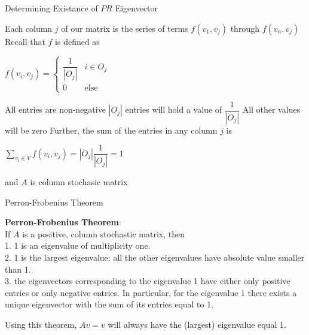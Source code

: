 \documentclass{beamer}
\begin{document}
\begin{frame}[t]{Determining Existance of $PR$ Eigenvector}
    \begin{outline}
        \1 Each column $j$ of our matrix is the series of terms $f(v_1, v_j)$ through $f(v_n, v_j)$
        \1 Recall that $f$ is defined as 
        \begin{center}
            $f(v_i, v_j)=\begin{cases} 
                \dfrac{1}{|O_j|} & i \in O_j\\
                0 & \text{else} 
             \end{cases}$\\
        \end{center}
        \1 All entries are non-negative
        \2 $|O_j|$ entries will hold a value of $\dfrac{1}{|O_j|}$
        \2 All other values will be zero
        \1 Further, the sum of the entries in any column $j$ is 
        \begin{center}
            $\sum\limits_{v_i \in V} f(v_i, v_j) = |O_j|\dfrac{1}{|O_j|} = 1$            
        \end{center}
        and $A$ is column stochasic matrix
    \end{outline}
\end{frame}

\begin{frame}[t]{Perron-Frobenius Theorem}
    \begin{outline}
        \begin{mdframed}[backgroundcolor=blue!20]
            \textbf{Perron-Frobenius Theorem}: \\If $A$ is a positive, column stochastic matrix, then\\
            1. 1 is an eigenvalue of multiplicity one.\\
            2. 1 is the largest eigenvalue: all the other eigenvalues have absolute value smaller than 1.\\
            3. the eigenvectors corresponding to the eigenvalue 1 have either only positive entries or only negative entries. In particular, for the eigenvalue 1 there exists a unique eigenvector with the sum of its entries equal to 1.\\
        \end{mdframed}
    Using this theorem, $Av = v$ will always have the (largest) eigenvalue equal 1.
    \end{outline}
\end{frame}
\end{document}
